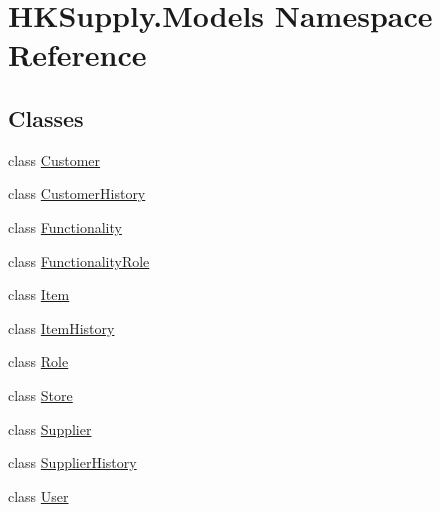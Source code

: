 \hypertarget{namespace_h_k_supply_1_1_models}{}\section{H\+K\+Supply.\+Models Namespace Reference}
\label{namespace_h_k_supply_1_1_models}
\subsection*{Classes}
\begin{DoxyCompactItemize}
\item 
class \hyperlink{class_h_k_supply_1_1_models_1_1_customer}{Customer}
\item 
class \hyperlink{class_h_k_supply_1_1_models_1_1_customer_history}{Customer\+History}
\item 
class \hyperlink{class_h_k_supply_1_1_models_1_1_functionality}{Functionality}
\item 
class \hyperlink{class_h_k_supply_1_1_models_1_1_functionality_role}{Functionality\+Role}
\item 
class \hyperlink{class_h_k_supply_1_1_models_1_1_item}{Item}
\item 
class \hyperlink{class_h_k_supply_1_1_models_1_1_item_history}{Item\+History}
\item 
class \hyperlink{class_h_k_supply_1_1_models_1_1_role}{Role}
\item 
class \hyperlink{class_h_k_supply_1_1_models_1_1_store}{Store}
\item 
class \hyperlink{class_h_k_supply_1_1_models_1_1_supplier}{Supplier}
\item 
class \hyperlink{class_h_k_supply_1_1_models_1_1_supplier_history}{Supplier\+History}
\item 
class \hyperlink{class_h_k_supply_1_1_models_1_1_user}{User}
\end{DoxyCompactItemize}

